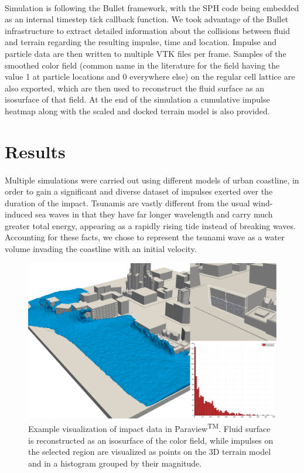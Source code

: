 \documentclass{llncs}
\begin{document}
\paragraph{} Simulation is following the Bullet framework, with the SPH code being
embedded as an internal timestep tick callback function. We took advantage of the Bullet
infrastructure to extract detailed information about the collisions between fluid and
terrain regarding the resulting impulse, time and location. Impulse and particle data are
then written to multiple VTK files per frame. Samples of the smoothed color field (common
name in the literature for the field having the value 1 at particle locations and 0
everywhere else) on the regular cell lattice are also exported, which are then used to
reconstruct the fluid surface as an isosurface of that field. At the end of the simulation
a cumulative impulse heatmap along with the scaled and docked terrain model is also
provided.

\section{Results}

\paragraph{} Multiple simulations were carried out using different models of urban
coastline, in order to gain a significant and diverse dataset of impulses exerted over the
duration of the impact. Tsunamis are vastly different from the usual wind-induced sea
waves in that they have far longer wavelength and carry much greater total energy,
appearing as a rapidly rising tide instead of breaking waves. Accounting for these facts,
we chose to represent the tsunami wave as a water volume invading the coastline with an
initial velocity.

\begin{figure}[h!]
  \includegraphics[width=\textwidth]{figures/paraview.png}
  \caption{Example visualization of impact data in Paraview\textsuperscript{TM}. Fluid
    surface is reconstructed as an isosurface of the color field, while impulses on the
    selected region are vi\-su\-a\-li\-zed as points on the 3D terrain model and in a
    histogram grouped by their magnitude.}
  \label{fig:visualization}
\end{figure}
\end{document}

